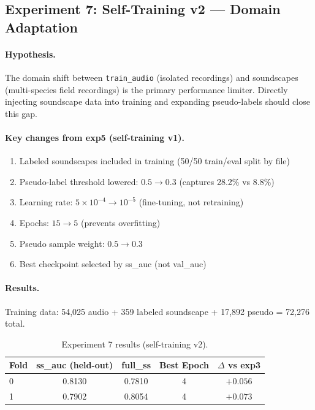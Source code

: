 \subsection{Experiment 7: Self-Training v2 — Domain Adaptation}
\label{sec:exp7}

\paragraph{Hypothesis.}
The domain shift between \texttt{train\_audio} (isolated recordings) and
soundscapes (multi-species field recordings) is the primary performance limiter.
Directly injecting soundscape data into training and expanding pseudo-labels
should close this gap.

\paragraph{Key changes from exp5 (self-training v1).}
\begin{enumerate}
    \item Labeled soundscapes included in training (50/50 train/eval split by file)
    \item Pseudo-label threshold lowered: $0.5 \to 0.3$ (captures 28.2\% vs 8.8\%)
    \item Learning rate: $5 \times 10^{-4} \to 10^{-5}$ (fine-tuning, not retraining)
    \item Epochs: $15 \to 5$ (prevents overfitting)
    \item Pseudo sample weight: $0.5 \to 0.3$
    \item Best checkpoint selected by ss\_auc (not val\_auc)
\end{enumerate}

\paragraph{Results.}
Training data: 54,025 audio + 359 labeled soundscape + 17,892 pseudo = 72,276 total.

\begin{table}[h]
\centering
\caption{Experiment 7 results (self-training v2).}
\label{tab:exp7}
\begin{tabular}{lcccc}
\hline
\textbf{Fold} & \textbf{ss\_auc (held-out)} & \textbf{full\_ss} & \textbf{Best Epoch} & \textbf{$\Delta$ vs exp3} \\
\hline
0 & 0.8130 & 0.7810 & 4 & $+0.056$ \\
1 & 0.7902 & 0.8054 & 4 & $+0.073$ \\
\hline
\end{tabular}
\end{table}

